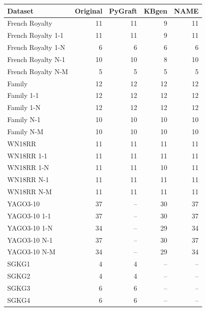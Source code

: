 \begin{tabular}{lrrrr}
\toprule
Dataset & Original & PyGraft & KBgen & NAME \\
\midrule
French Royalty & 11 & 11 & 9 & 11 \\
French Royalty 1-1 & 11 & 11 & 9 & 11 \\
French Royalty 1-N & 6 & 6 & 6 & 6 \\
French Royalty N-1 & 10 & 10 & 8 & 10 \\
French Royalty N-M & 5 & 5 & 5 & 5 \\
\midrule
Family & 12 & 12 & 12 & 12 \\
Family 1-1 & 12 & 12 & 12 & 12 \\
Family 1-N & 12 & 12 & 12 & 12 \\
Family N-1 & 10 & 10 & 10 & 10 \\
Family N-M & 10 & 10 & 10 & 10 \\
\midrule
WN18RR & 11 & 11 & 11 & 11 \\
WN18RR 1-1 & 11 & 11 & 11 & 11 \\
WN18RR 1-N & 11 & 11 & 10 & 11 \\
WN18RR N-1 & 11 & 11 & 11 & 11 \\
WN18RR N-M & 11 & 11 & 11 & 11 \\
\midrule
YAGO3-10 & 37 & – & 30 & 37 \\
YAGO3-10 1-1 & 37 & – & 30 & 37 \\
YAGO3-10 1-N & 34 & – & 29 & 34 \\
YAGO3-10 N-1 & 37 & – & 30 & 37 \\
YAGO3-10 N-M & 34 & – & 29 & 34 \\
\midrule
SGKG1 & 4 & 4 & – & – \\
SGKG2 & 4 & 4 & – & – \\
SGKG3 & 6 & 6 & – & – \\
SGKG4 & 6 & 6 & – & – \\
\bottomrule
\end{tabular}
